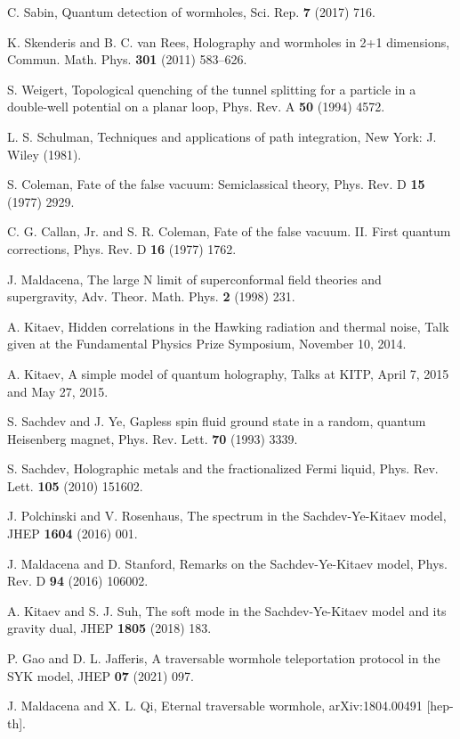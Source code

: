 \documentclass[12pt]{article}
\begin{document}
\begin{thebibliography}{99}
C. Sabin, Quantum detection of wormholes, Sci. Rep. {\bf7} (2017) 716.

K. Skenderis and B. C. van Rees, Holography and wormholes in 2+1 dimensions, Commun. Math. Phys. {\bf301} (2011) 583–626.

S. Weigert, Topological quenching of the tunnel splitting for a particle in a double-well potential on a planar loop, Phys. Rev. A  {\bf50}  (1994) 4572.

L. S. Schulman, Techniques and applications of path integration, New York: J. Wiley (1981).

S. Coleman, Fate of the false vacuum: Semiclassical theory,  Phys. Rev. D  {\bf15} (1977) 2929.

C. G. Callan, Jr. and S. R. Coleman, Fate of the false vacuum. II. First quantum corrections, Phys. Rev. D {\bf16} (1977) 1762.


J. Maldacena, The large N limit of superconformal field theories and supergravity, Adv. Theor. Math. Phys. {\bf2} (1998) 231.

A. Kitaev, Hidden correlations in the Hawking radiation and thermal noise, Talk given at the Fundamental Physics Prize Symposium, November 10, 2014.

A. Kitaev, A simple model of quantum holography, Talks at KITP, April 7, 2015 and May 27, 2015.

S. Sachdev and J. Ye, Gapless spin fluid ground state in a random, quantum Heisenberg magnet, Phys. Rev. Lett. {\bf70} (1993) 3339.

S. Sachdev, Holographic metals and the fractionalized Fermi liquid, Phys. Rev. Lett. {\bf105} (2010) 151602.

J. Polchinski and V. Rosenhaus, The spectrum in the Sachdev-Ye-Kitaev model, JHEP {\bf1604} (2016) 001.

J. Maldacena and D. Stanford, Remarks on the Sachdev-Ye-Kitaev model, Phys. Rev. D {\bf94} (2016) 106002.

A. Kitaev and S. J. Suh, The soft mode in the Sachdev-Ye-Kitaev model and its gravity dual, JHEP {\bf1805} (2018) 183.

P. Gao and D. L. Jafferis, A traversable wormhole teleportation protocol in the SYK model, JHEP {\bf07} (2021) 097.

J. Maldacena and X. L. Qi, Eternal traversable wormhole, arXiv:1804.00491 [hep-th].


\end{thebibliography}
\end{document}
